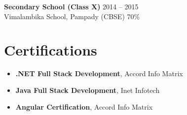 \documentclass[10pt, letterpaper]{article}
\begin{document}
\textbf{Secondary School (Class X)} \hfill 2014 -- 2015 \\
Vimalambika School, Pampady (CBSE) \hfill 70\%

\section*{Certifications}
\begin{itemize}[leftmargin=0.25in, itemsep=0pt, parsep=0pt, topsep=2pt]
    \item \textbf{.NET Full Stack Development}, Accord Info Matrix
    \item \textbf{Java Full Stack Development}, Inet Infotech
    \item \textbf{Angular Certification}, Accord Info Matrix
\end{itemize}
\end{document}
